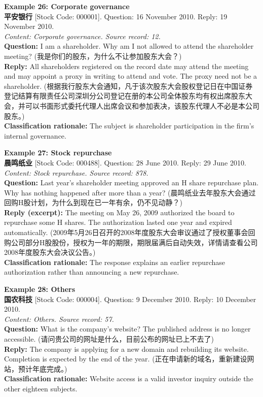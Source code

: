 \clearpage
\noindent \textbf{Example 26: Corporate governance} \\
\textbf{平安银行} [Stock Code: 000001]. Question: 16 November 2010. Reply: 19 November 2010. \\
\textit{Content: Corporate governance. Source record: 12.} \\
\textbf{Question:} I am a shareholder. Why am I not allowed to attend the shareholder meeting? (我是你们的股东，为什么不让参加股东大会？) \\
\textbf{Reply:} All shareholders registered on the record date may attend the meeting and may appoint a proxy in writing to attend and vote. The proxy need not be a shareholder. (根据我行股东大会通知，凡于该次股东大会股权登记日在中国证券登记结算有限责任公司深圳分公司登记在册的本公司全体股东均有权出席股东大会，并可以书面形式委托代理人出席会议和参加表决，该股东代理人不必是本公司股东。) \\
\textbf{Classification rationale:} The subject is shareholder participation in the firm's internal governance.

\vspace{0.4cm}
\noindent \textbf{Example 27: Stock repurchase} \\
\textbf{晨鸣纸业} [Stock Code: 000488]. Question: 28 June 2010. Reply: 29 June 2010. \\
\textit{Content: Stock repurchase. Source record: 878.} \\
\textbf{Question:} Last year's shareholder meeting approved an H share repurchase plan. Why has nothing happened after more than a year? (晨鸣纸业去年股东大会通过回购H股计划，为什么到现在已一年有余，仍不见动静？) \\
\textbf{Reply (excerpt):} The meeting on May 26, 2009 authorized the board to repurchase some H shares. The authorization lasted one year and expired automatically. (2009年5月26日召开的2008年度股东大会审议通过了授权董事会回购公司部分H股股份，授权为一年的期限，期限届满后自动失效，详情请查看公司2008年度股东大会决议公告。) \\
\textbf{Classification rationale:} The response explains an earlier repurchase authorization rather than announcing a new repurchase.

\clearpage
\noindent \textbf{Example 28: Others} \\
\textbf{国农科技} [Stock Code: 000004]. Question: 9 December 2010. Reply: 10 December 2010. \\
\textit{Content: Others. Source record: 57.} \\
\textbf{Question:} What is the company's website? The published address is no longer accessible. (请问贵公司的网址是什么，目前公布的网址已上不去了) \\
\textbf{Reply:} The company is applying for a new domain and rebuilding its website. Completion is expected by the end of the year. (正在申请新的域名，重新建设网站，预计年底完成。) \\
\textbf{Classification rationale:} Website access is a valid investor inquiry outside the other eighteen subjects.

